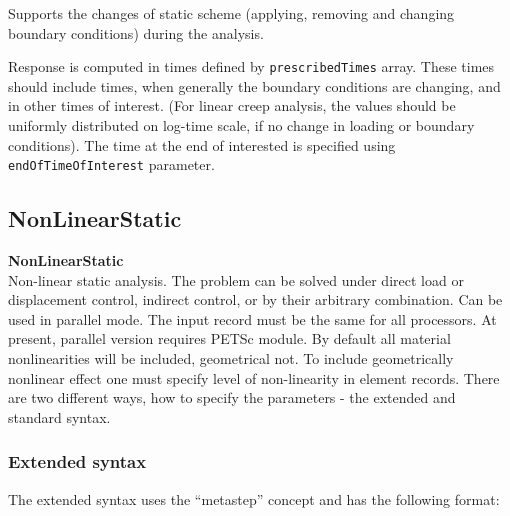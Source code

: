 \documentclass[a4paper]{article}
\newcommand{\param}[1]{\texttt{#1}} %
\newcommand{\entKeywordInst}[1]{\textbf{#1}} %
\newcommand{\Pmode}[1]{{\sffamily #1}}
\begin{document}
Supports the changes of static scheme (applying, removing and changing  boundary conditions)
during the analysis.

Response is computed in times defined by \param{pre\-scri\-bed\-Ti\-mes}
array. These times should include times, when generally the  boundary
conditions are changing, and in other times of interest. (For linear creep
analysis, the values should be uniformly distributed on log-time scale, if no change in
loading or boundary conditions). The time at the end of interested is
specified using \param{endOfTimeOfInterest} parameter.

\subsection{NonLinearStatic}
\label{NonLinearStatic}
\entKeywordInst{NonLinearStatic} \\
Non-linear static analysis. The problem can be solved under
direct load or displacement control, indirect control, or by
their arbitrary combination.
\Pmode{Can be used in parallel mode. The input record must be the same
for all processors. At present, parallel version requires PETSc module.}
By default all
material nonlinearities will be included, geometrical not.
To include geometrically nonlinear effect one must specify
level of non-linearity in element records.
There are two different ways, how to specify the parameters - the
extended and standard syntax.
\subsubsection{Extended syntax}
The extended syntax uses the ``metastep'' concept and has the
following format:
\end{document}
